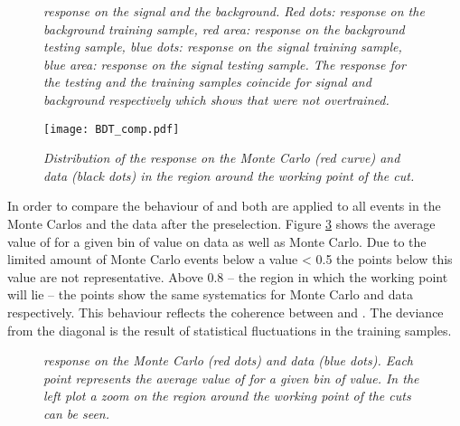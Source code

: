 \begin{figure}[ht]
\begin{center}
\end{center}
\vspace*{-0.8cm}
\caption{\textit{\bdtn response on the signal and the background. Red dots: response on the background training sample, red area: response on the background testing sample, blue dots: response on the signal training sample, blue area: response on the signal testing sample. The response for the testing and the training samples coincide for signal and background respectively which shows that \bdts were not overtrained.}}
\label{fig:resp}
\end{figure}

\begin{figure}[ht]
\begin{center}
\texttt{[image: BDT\_comp.pdf]}
\end{center}
\vspace*{-0.5cm}
\caption{\textit{Distribution of the \bdtn response on the \BdToJPsieeKst Monte Carlo (red curve) and \BdToJPsieeKst \lhcb data (black dots) in the region around the working point of the \bdtn cut.}}
\label{fig:comp}
\end{figure}

In order to compare the behaviour of \bdta and \bdtb both are applied to all events in the \BdKstee Monte Carlos and the \lhcb data after the preselection. Figure \ref{fig:bdtvsbdt} shows the average value of \bdtb for a given bin of \bdta  value on data as well as Monte Carlo. Due to the limited amount of Monte Carlo events below a \bdtn value < 0.5 the points below this value are not representative. Above 0.8 -- the region in which the working point will lie -- the points show the same systematics for Monte Carlo and data respectively. This behaviour reflects the coherence between \bdta and \bdtb. The deviance from the diagonal is the result of statistical fluctuations in the training samples.

\begin{figure}[ht]
\begin{center}
\end{center}
\caption{\textit{\bdtn response on the \BdKstee Monte Carlo (red dots) and \lhcb data (blue dots). Each point represents the average value of \bdtb for a given bin of \bdta value. In the left plot a zoom on the region around the working point of the \bdtn cuts can be seen.}}
\label{fig:bdtvsbdt}
\end{figure}
\newpage

